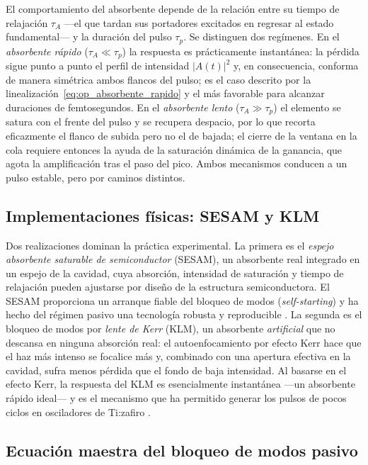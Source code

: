 El comportamiento del absorbente depende de la relación entre su tiempo de
relajación $\tau_A$ —el que tardan sus portadores excitados en regresar al estado
fundamental— y la duración del pulso $\tau_p$. Se distinguen dos regímenes. En el
\emph{absorbente rápido} ($\tau_A \ll \tau_p$) la respuesta es prácticamente
instantánea: la pérdida sigue punto a punto el perfil de intensidad
$|A(t)|^2$ y, en consecuencia, conforma de manera simétrica ambos flancos del
pulso; es el caso descrito por la linealización~\eqref{eq:op_absorbente_rapido} y
el más favorable para alcanzar duraciones de femtosegundos. En el \emph{absorbente
lento} ($\tau_A \gg \tau_p$) el elemento se satura con el frente del pulso y se
recupera despacio, por lo que recorta eficazmente el flanco de subida pero no el de
bajada; el cierre de la ventana en la cola requiere entonces la ayuda de la
saturación dinámica de la ganancia, que agota la amplificación tras el paso del
pico. Ambos mecanismos conducen a un pulso estable, pero por caminos distintos.

\subsection{Implementaciones físicas: SESAM y KLM}
\label{sec:sesam_klm}

Dos realizaciones dominan la práctica experimental. La primera es el \emph{espejo
absorbente saturable de semiconductor} (SESAM), un absorbente real integrado en un
espejo de la cavidad, cuya absorción, intensidad de saturación y tiempo de
relajación pueden ajustarse por diseño de la estructura semiconductora. El SESAM
proporciona un arranque fiable del bloqueo de modos (\emph{self-starting}) y ha
hecho del régimen pasivo una tecnología robusta y reproducible
\cite{Keller1996,Keller2003}. La segunda es el bloqueo de modos por \emph{lente de
Kerr} (KLM), un absorbente \emph{artificial} que no descansa en ninguna absorción
real: el autoenfocamiento por efecto Kerr hace que el haz más intenso se focalice
más y, combinado con una apertura efectiva en la cavidad, sufra menos pérdida que
el fondo de baja intensidad. Al basarse en el efecto Kerr, la respuesta del KLM es
esencialmente instantánea —un absorbente rápido ideal— y es el mecanismo que ha
permitido generar los pulsos de pocos ciclos en osciladores de Ti:zafiro
\cite{Krausz1992,Keller2022}.

\subsection{Ecuación maestra del bloqueo de modos pasivo}
\label{sec:haus_pasivo}

